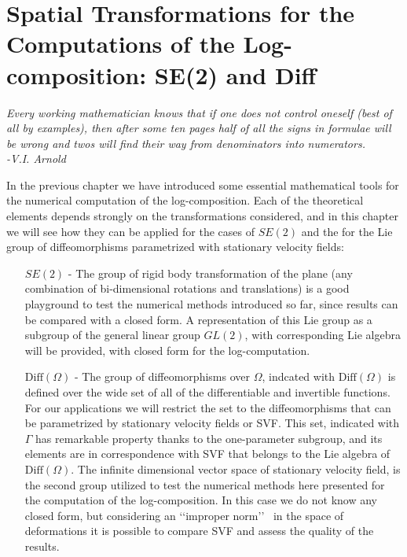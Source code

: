 \chapter{Spatial Transformations for the Computations of the Log-composition: SE(2) and Diff}\label{ch:spatial_transformations}


\begin{flushright}
	\emph{Every working mathematician knows that if one does not control oneself (best of all by examples), then after some ten pages half of all the signs in formulae will be wrong and twos will find their way from denominators into numerators. \\ -V.I. Arnold}
\end{flushright}

\noindent
In the previous chapter we have introduced some essential mathematical tools for the numerical computation of the log-composition. Each of the theoretical elements depends strongly on the transformations considered, and in this chapter we will see how they can be applied for the cases of $SE(2)$ and the for the Lie group of diffeomorphisms parametrized with stationary velocity fields:
\begin{enumerate}
	\item[$SE(2)$ -] The group of rigid body transformation of the plane (any combination of bi-dimensional rotations and translations) is a good playground to test the numerical methods introduced so far, since results can be compared with a closed form.
	A representation of this Lie group as a subgroup of the general linear group $GL(2)$, with corresponding Lie algebra will be provided, with closed form for the log-computation.
	\item[$\text{Diff}(\Omega)$ -] The group of diffeomorphisms over $\Omega$, indcated with $\text{Diff}(\Omega)$ is defined over the wide set of all of the differentiable and invertible functions. For our applications we will restrict the set to the diffeomorphisms that can be parametrized by stationary velocity fields or SVF. This set, indicated with $\Gamma$ has remarkable property thanks to the one-parameter subgroup, and its elements are in correspondence with SVF that belongs to the Lie algebra of $\text{Diff}(\Omega)$. The infinite dimensional vector space of stationary velocity field, is the second group utilized to test the numerical methods here presented for the computation of the log-composition. In this case we do not know any closed form, but considering an \lq\lq improper norm\rq\rq~ in the space of deformations it is possible to compare SVF and assess the quality of the results.
\end{enumerate}


